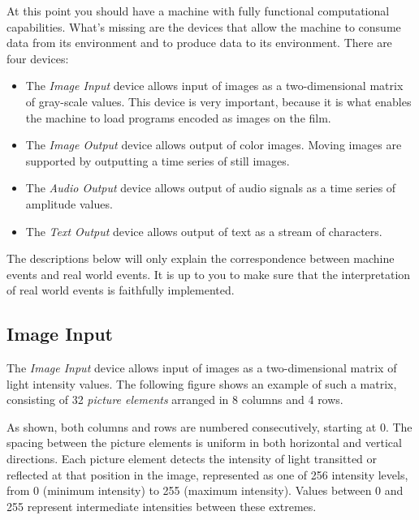\documentclass[a4paper,12pt]{article}
\begin{document}
At this point you should have a machine with fully functional computational capabilities.
What's missing are the devices that allow the machine to consume data from its environment and to produce data to its environment.
There are four devices:
\begin{itemize}
\item The \emph{Image Input} device allows input of images as a two-dimensional matrix of gray-scale values.
  This device is very important, because it is what enables the machine to load programs encoded as images on the film.
\item The \emph{Image Output} device allows output of color images.
  Moving images are supported by outputting a time series of still images.
\item The \emph{Audio Output} device allows output of audio signals as a time series of amplitude values.
\item The \emph{Text Output} device allows output of text as a stream of characters.
\end{itemize}
The descriptions below will only explain the correspondence between machine events and real world events.
It is up to you to make sure that the interpretation of real world events is faithfully implemented.

\subsection{Image Input}

The \emph{Image Input} device allows input of images as a two-dimensional matrix of light intensity values.
The following figure shows an example of such a matrix, consisting of 32 \emph{picture elements} arranged in 8 columns and 4 rows.
\begin{center}
\end{center}
As shown, both columns and rows are numbered consecutively, starting at 0.
The spacing between the picture elements is uniform in both horizontal and vertical directions.
Each picture element detects the intensity of light transitted or reflected at that position in the image, represented as one of 256 intensity levels, from 0 (minimum intensity) to 255 (maximum intensity).
Values between 0 and 255 represent intermediate intensities between these extremes.
\end{document}
